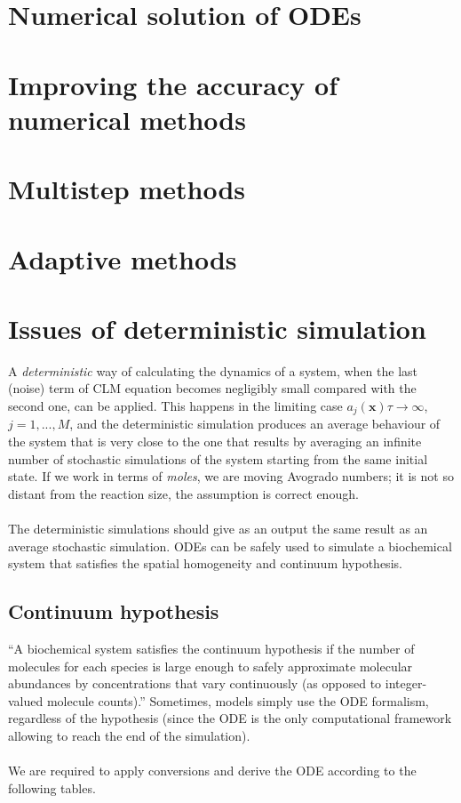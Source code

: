 \section{Numerical solution of ODEs}

\section{Improving the accuracy of numerical methods}

\section{Multistep methods}

\section{Adaptive methods}

\section{Issues of deterministic simulation}





A \emph{deterministic} way of calculating the dynamics of a system, when the last (noise) term of CLM equation becomes negligibly small compared with the second one, can be applied.
This happens in the limiting case $a_j(\mathbf{x})\tau → \infty$, $j = 1,...,M$, and the deterministic simulation produces an average behaviour of the system that is very close to the one that results by averaging an infinite number of stochastic simulations of the system starting from the same initial state.
If we work in terms of \emph{moles}, we are moving Avogrado numbers; it is not so distant from the reaction size, the assumption is correct enough.
\\
\\
\noindent
The deterministic simulations should give as an output the same result as an average stochastic simulation.
ODEs can be safely used to simulate a biochemical system that satisfies the spatial homogeneity and continuum hypothesis.
  \subsection{Continuum hypothesis}
  ``A biochemical system satisfies the continuum hypothesis if the number of molecules for each species is large enough to safely approximate molecular abundances by concentrations that vary continuously (as opposed to integer- valued molecule counts).''
  Sometimes, models simply use the ODE formalism, regardless of the hypothesis (since the ODE is the only computational framework allowing to reach the end of the simulation).
  \\
  \\
  \noindent
  We are required to apply conversions and derive the ODE according to the following tables.

